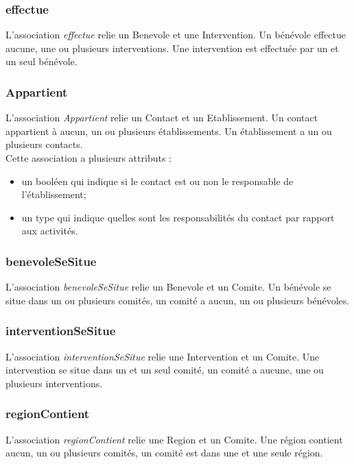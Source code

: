 \subsubsection*{effectue} 

L'association \textit{effectue} relie un Benevole et une Intervention. Un bénévole effectue aucune, une ou plusieurs interventions. Une intervention est effectuée par un et un seul bénévole. 

\subsubsection*{Appartient}

L'association \textit{Appartient} relie un Contact et un Etablissement. Un contact appartient à aucun, un ou plusieurs établissements. Un établissement a un ou plusieurs contacts.\\
Cette association a plusieurs attributs :
\begin{itemize}
\item un booléen qui indique si le contact est ou non le responsable de l'établissement; 
\item un type qui indique quelles sont les responsabilités du contact par rapport aux activités.
\end{itemize}


\subsubsection*{benevoleSeSitue}

L'association \textit{benevoleSeSitue} relie un Benevole et un Comite. Un bénévole se situe dans un ou plusieurs comités, un comité a aucun, un ou plusieurs bénévoles.

\subsubsection*{interventionSeSitue}

L'association \textit{interventionSeSitue} relie une Intervention et un Comite. Une intervention se situe dans un et un seul comité, un comité a aucune, une ou plusieurs interventions.

\subsubsection*{regionContient}

L'association \textit{regionContient} relie une Region et un Comite. Une région contient aucun, un ou plusieurs comités, un comité est dans une et une seule région.

